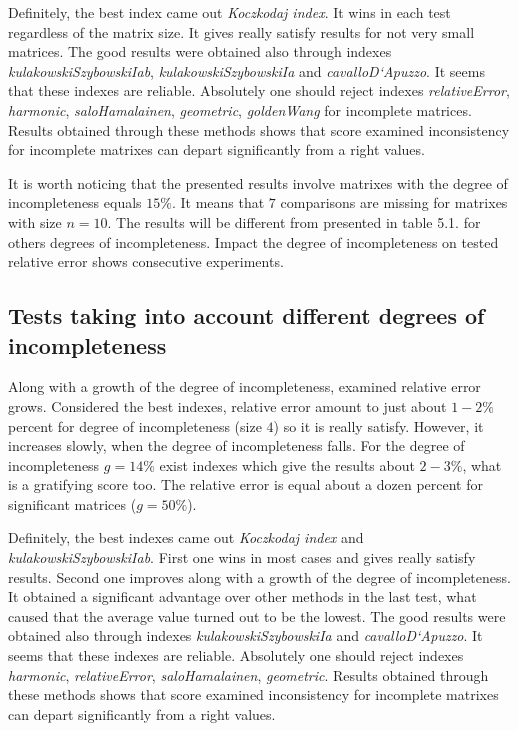 Definitely, the best index came out \textit{Koczkodaj index}. It wins in each test regardless of the matrix size. It gives really satisfy results for not very small matrices. The good results were obtained also through indexes \textit{kulakowskiSzybowskiIab}, \textit{kulakowskiSzybowskiIa} and \textit{cavalloD`Apuzzo}. It seems that these indexes are reliable. Absolutely one should reject indexes \textit{relativeError}, \textit{harmonic}, \textit{saloHamalainen}, \textit{geometric}, \textit{goldenWang} for incomplete matrices. Results obtained through these methods shows that score examined inconsistency for incomplete matrixes can depart significantly from a right values.

It is worth noticing that the presented results involve matrixes with the degree of incompleteness equals $15\%$. It means that $7$ comparisons are missing for matrixes with size $n = 10$. The results will be different from presented in table 5.1. for others degrees of incompleteness. Impact the degree of incompleteness on tested relative error shows consecutive experiments.

\subsection{Tests taking into account different degrees of incompleteness}
Along with a growth of the degree of incompleteness, examined relative error grows. Considered the best indexes, relative error amount to just about $1 - 2\%$ percent for degree of incompleteness (size $4$) so it is really satisfy. However, it increases slowly, when the degree of incompleteness falls. For the degree of incompleteness $g=14\%$ exist indexes which give the results about $2 - 3 \%$, what is a gratifying score too. The relative error is equal about a dozen percent for significant matrices ($g=50\%$).

Definitely, the best indexes came out \textit{Koczkodaj index} and \textit{kulakowskiSzybowskiIab}. First one wins in most cases and gives really satisfy results. Second one improves along with a growth of the degree of incompleteness. It obtained a significant advantage over other methods in the last test, what caused that the average value turned out to be the lowest. 
The good results were obtained also through indexes \textit{kulakowskiSzybowskiIa} and \textit{cavalloD`Apuzzo}. It seems that these indexes are reliable. Absolutely one should reject indexes \textit{harmonic}, \textit{relativeError}, \textit{saloHamalainen}, \textit{geometric}. Results obtained through these methods shows that score examined inconsistency for incomplete matrixes can depart significantly from a right values.

